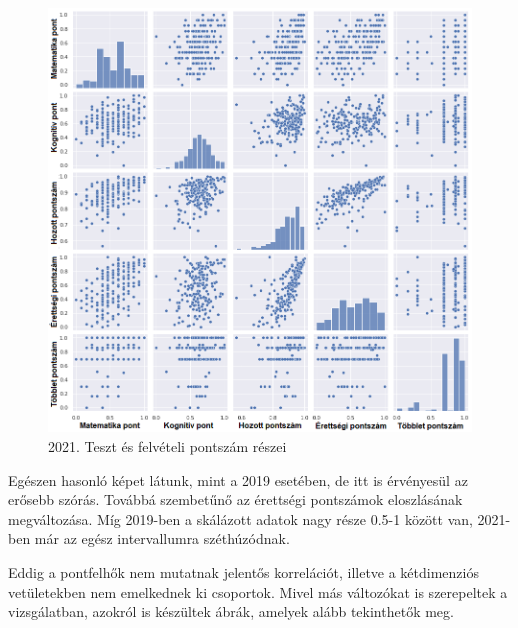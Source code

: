 \documentclass[12pt]{article}
\begin{document}
\begin{figure}[H]
\centering
\includegraphics[width=\textwidth]{kepek/2021minmax3.png}
\caption{2021. Teszt és felvételi pontszám részei}
\label{fig:2021minmax3}
\end{figure}

Egészen hasonló képet látunk, mint a 2019 esetében, de itt is érvényesül az erősebb szórás. Továbbá szembetűnő az érettségi pontszámok eloszlásának megváltozása. Míg 2019-ben a skálázott adatok nagy része 0.5-1 között van, 2021-ben már az egész intervallumra széthúzódnak. 

Eddig a pontfelhők nem mutatnak jelentős korrelációt, illetve a kétdimenziós vetületekben nem emelkednek ki csoportok. Mivel más változókat is szerepeltek a vizsgálatban, azokról is készültek ábrák, amelyek alább tekinthetők meg.
\end{document}
